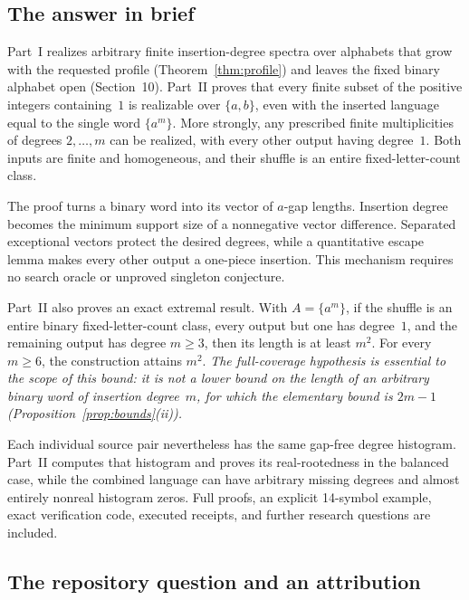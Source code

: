 \documentclass[11pt,letterpaper]{article}
\theoremstyle{definition}\newtheorem{definition}[theorem]{Definition}
\theoremstyle{remark}\newtheorem{remark}[theorem]{Remark}
\theoremstyle{definition}\newtheorem{question}[theorem]{Question}
\begin{document}
\subsection{The answer in brief}\label{ids:bp:sec:brief}

Part~I realizes arbitrary finite insertion-degree spectra over alphabets that
grow with the requested profile (Theorem~\ref{thm:profile}) and leaves the
fixed binary alphabet open (Section~10). Part~II proves that every finite
subset of the positive integers containing~$1$ is realizable over $\{a,b\}$,
even with the inserted language equal to the single word $\{a^m\}$. More
strongly, any prescribed finite multiplicities of degrees $2,\ldots,m$ can be
realized, with every other output having degree~$1$. Both inputs are finite
and homogeneous, and their shuffle is an entire fixed-letter-count class.

The proof turns a binary word into its vector of $a$-gap lengths. Insertion
degree becomes the minimum support size of a nonnegative vector difference.
Separated exceptional vectors protect the desired degrees, while a
quantitative escape lemma makes every other output a one-piece insertion. This
mechanism requires no search oracle or unproved singleton conjecture.

Part~II also proves an exact extremal result. With $A=\{a^m\}$, if the shuffle
is an entire binary fixed-letter-count class, every output but one has
degree~$1$, and the remaining output has degree $m\geq3$, then its length is
at least $m^2$. For every $m\geq6$, the construction attains $m^2$.
\emph{The full-coverage hypothesis is essential to the scope of this bound: it
is not a lower bound on the length of an arbitrary binary word of insertion
degree~$m$, for which the elementary bound is $2m-1$
(Proposition~\ref{prop:bounds}(ii)).}

Each individual source pair nevertheless has the same gap-free degree
histogram. Part~II computes that histogram and proves its real-rootedness in
the balanced case, while the combined language can have arbitrary missing
degrees and almost entirely nonreal histogram zeros. Full proofs, an explicit
14-symbol example, exact verification code, executed receipts, and further
research questions are included.

\subsection{The repository question and an attribution}\label{ids:bp:sec:question}
\end{document}
